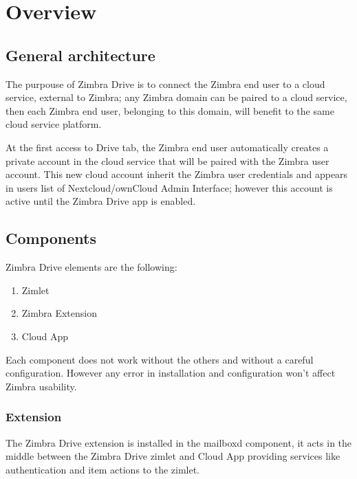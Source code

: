 \section{Overview}
\subsection{General architecture}\label{subsec:general architecture}
    The purpouse of Zimbra Drive is to connect the Zimbra end user to a cloud service, external to Zimbra;
    any Zimbra domain can be paired to a cloud service, then each Zimbra end user, belonging to this domain,
    will benefit to the same cloud service platform.

    At the first access to Drive tab, the Zimbra end user automatically creates a private account in the cloud service
    that will be paired with the Zimbra user account.
    This new cloud account inherit the Zimbra user credentials and appears in users list of Nextcloud/ownCloud Admin Interface;
    however this account is active until the Zimbra Drive app is enabled.

%

\subsection{Components}
    Zimbra Drive elements are the following:
    \begin{enumerate}
        \item Zimlet
        \item Zimbra Extension
        \item Cloud App
    \end{enumerate}
    \begin{warning}
        Each component does not work without the others and without a careful configuration.
        However any error in installation and configuration won't affect Zimbra usability.
    \end{warning}

        \subsubsection{Extension}
        The Zimbra Drive extension is installed in the mailboxd component, it acts in the middle between the Zimbra
        Drive zimlet and Cloud App providing services like authentication and item actions to the zimlet.

